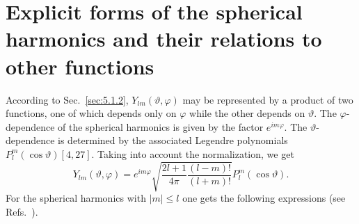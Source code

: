 \section{Explicit forms of the spherical harmonics and their relations to other functions}\label{sec:5.2}
According to Sec.~\ref{sec:5.1.2}, $Y_{l m}(\vartheta, \varphi)$ may be represented by a product of two functions, one of which depends only on $\varphi$ while the other depends on $\vartheta$. The $\varphi$-dependence of the spherical harmonics is given by the factor $e^{i m \varphi}$. The $\vartheta$-dependence is determined by the associated Legendre polynomials $P_{l}^{m}(\cos \vartheta)[4,27]$. Taking into account the normalization, we get
\begin{equation}
Y_{l m}(\vartheta, \varphi)=e^{i m \varphi} \sqrt{\frac{2 l+1}{4 \pi} \frac{(l-m)!}{(l+m)!}} P_{l}^{m}(\cos \vartheta) .\label{eq:5:2:1}
\end{equation}
For the spherical harmonics with $|m| \leq l$ one gets the following expressions (see Refs.~\cite{ref004, ref022, ref027}).

